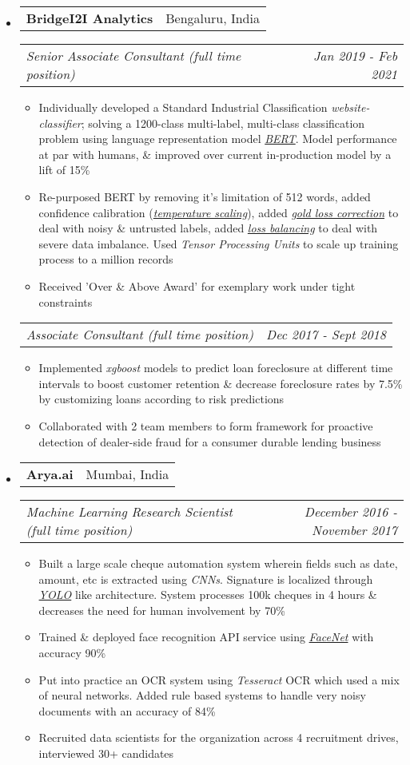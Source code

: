 \documentclass[letterpaper, 11pt]{article}
\makeatletter
\newcommand{\resitem}[1]{\item #1 \vspace{-2pt}}
\newcommand{\ressubheadinga}[2]{
\begin{tabular*}{7.11in}{l@{\extracolsep{\fill}}r}
		\textbf{#1} & #2 \\
\end{tabular*}}
\newcommand{\ressubheadingb}[2]{
\begin{tabular*}{7.11in}{l@{\extracolsep{\fill}}r}
		\textit{#1} & \textit{#2} \\
\end{tabular*}\vspace{-6pt}}
\makeatother
\begin{document}
\begin{itemize}
\item
	\ressubheadinga{BridgeI2I Analytics}{Bengaluru, India}
	\ressubheadingb{Senior Associate Consultant (full time position)}{Jan 2019 - Feb 2021}
	\begin{itemize}
        \resitem{Individually developed a Standard Industrial Classification \emph{website-classifier}; solving a 1200-class multi-label, multi-class classification problem using language representation model \href{https://arxiv.org/abs/1810.04805}{\emph{BERT}}. Model performance at par with humans, \& improved over current in-production model by a lift of 15\%}
        \resitem{Re-purposed BERT by removing it's limitation of 512 words, added confidence calibration (\href{https://arxiv.org/pdf/1706.04599.pdf}{\emph{temperature scaling}}), added \href{https://arxiv.org/pdf/1802.05300.pdf}{\emph{gold loss correction}} to deal with noisy \& untrusted labels, added \href{https://openaccess.thecvf.com/content_CVPR_2019/papers/Cui_Class-Balanced_Loss_Based_on_Effective_Number_of_Samples_CVPR_2019_paper.pdf}{\emph{loss balancing}} to deal with severe data imbalance. Used \emph{Tensor Processing Units} to scale up training process to a million records}
        \resitem{Received 'Over \& Above Award' for exemplary work under tight constraints}
	\end{itemize}
	\ressubheadingb{Associate Consultant (full time position)}{Dec 2017 - Sept 2018}
	\begin{itemize}
        \resitem{Implemented \emph{xgboost} models to predict loan foreclosure at different time intervals to boost customer retention \& decrease foreclosure rates by 7.5\% by customizing loans according to risk predictions}
        \resitem{Collaborated with 2 team members to form framework for proactive detection of dealer-side fraud for a consumer durable lending business}
	\end{itemize}	
\end{itemize}

\begin{itemize}
\item
	\ressubheadinga{Arya.ai}{Mumbai, India}
	\ressubheadingb{Machine Learning Research Scientist (full time position)}{December 2016 - November 2017}
	\begin{itemize}
            \resitem{Built a large scale cheque automation system wherein fields such as date, amount, etc is extracted using \emph{CNNs}. Signature is localized through \href{https://arxiv.org/abs/1506.02640}{\emph{YOLO}} like architecture. System processes 100k cheques in 4 hours \& decreases the need for human involvement by 70\%}
            \resitem{Trained \& deployed face recognition API service using \href{arxiv.org/abs/1503.03832}{\emph{FaceNet}} with accuracy 90\%}
            \resitem{Put into practice an OCR system using \emph{Tesseract} OCR which used a mix of neural networks. Added rule based systems to handle very noisy documents with an accuracy of 84\%}
            \resitem{Recruited data scientists for the organization across 4 recruitment drives, interviewed 30+ candidates}
	\end{itemize}
\end{itemize}
\end{document}
